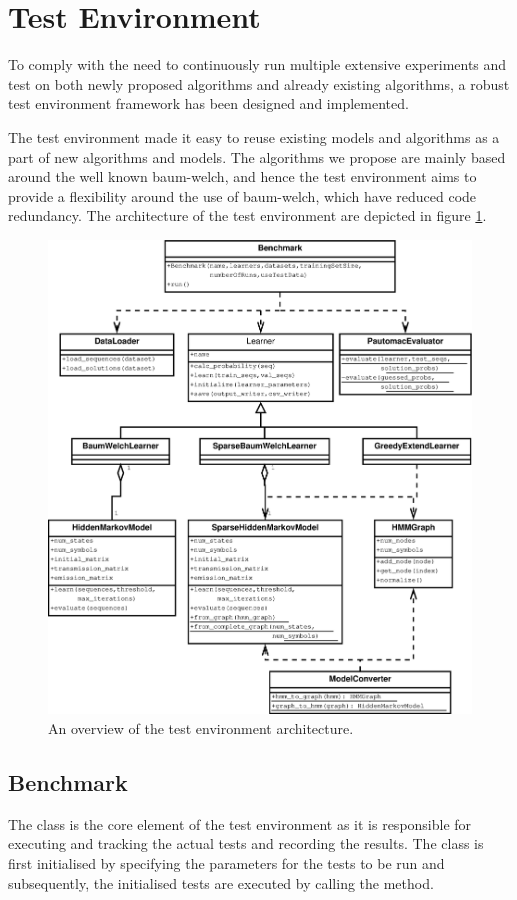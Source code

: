 \section{Test Environment}
To comply with the need to continuously run multiple extensive experiments and test on both newly proposed algorithms and already existing algorithms, a robust test environment framework has been designed and implemented.

The test environment made it easy to reuse existing models and algorithms as a part of new algorithms and models. 
The algorithms we propose are mainly based around the well known \gls{baum-welch}, and hence the test environment aims to provide a flexibility around the use of \gls{baum-welch}, which have reduced code redundancy.
The architecture of the test environment are depicted in figure \ref{fig:testenvironment}.

\begin{figure}[!htb]
\centering
\includegraphics[scale=.4]{pictures/test-environment-overview.eps}
\caption{An overview of the test environment architecture.}
\label{fig:testenvironment}
\end{figure}

\subsection{Benchmark}
The  class is the core element of the test environment as it is responsible for executing and tracking the actual tests and recording the results. The  class is first initialised by specifying the parameters for the tests to be run and subsequently, the initialised tests are executed by calling the  method.

